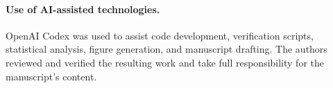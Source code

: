 \documentclass[smallextended]{svjour3}
\begin{document}
\paragraph{Use of AI-assisted technologies.} OpenAI Codex was used to assist code development, verification scripts, statistical analysis, figure generation, and manuscript drafting. The authors reviewed and verified the resulting work and take full responsibility for the manuscript's content.

\end{document}
